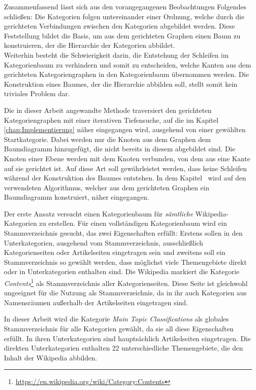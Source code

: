 Zusammenfassend lässt sich aus den vorangegangenen Beobachtungen Folgendes schließen: Die Kategorien folgen untereinander einer Ordnung, welche durch die gerichteten Verbindungen zwischen den Kategorien abgebildet werden.
Diese Feststellung bildet die Basis, um aus dem gerichteten Graphen einen Baum zu konstruieren, der die Hierarchie der Kategorien abbildet.\\
Weiterhin besteht die Schwierigkeit darin, die Entstehung der Schleifen im Kategorienbaum zu verhindern und somit zu entscheiden, welche Kanten aus dem gerichteten Kategoriengraphen in den Kategorienbaum übernommen werden.
Die Konstruktion eines Baumes, der die Hierarchie abbilden soll, stellt somit kein triviales Problem dar.

Die in dieser Arbeit angewandte Methode traversiert den gerichteten Kategoriengraphen mit einer iterativen Tiefensuche, auf die im Kapitel \ref{chap:Implementierung} näher eingegangen wird, ausgehend von einer gewählten Startkategorie.
Dabei werden nur die Knoten aus dem Graphen dem Baumdiagramm hinzugefügt, die nicht bereits in diesem abgebildet sind.
Die Knoten einer Ebene werden mit dem Knoten verbunden, von dem aus eine Kante auf sie gerichtet ist.
Auf diese Art soll gewährleistet werden, dass keine Schleifen während der Konstruktion des Baumes entstehen.
In dem Kapitel~ wird auf den verwendeten Algorithmus, welcher aus dem gerichteten Graphen ein Baumdiagramm konstruiert, näher eingegangen.

Der erste Ansatz versucht einen Kategorienbaum für \emph{sämtliche} Wikipedia-Kategorien zu erstellen.
Für einen vollständigen Kategorienbaum wird ein Stammverzeichnis gesucht, das zwei Eigenschaften erfüllt: Erstens sollen in den Unterkategorien, ausgehend vom Stammverzeichnis, ausschließlich Kategorienseiten oder Artikelseiten eingetragen sein und zweitens soll ein Stammverzeichnis so gewählt werden, dass möglichst viele Themengebiete direkt oder in Unterkategorien enthalten sind.
Die Wikipedia markiert die Kategorie \emph{Contents}\footnote{\url{https://en.wikipedia.org/wiki/Category:Contents}} als Stammverzeichnis aller Kategorienseiten.
Diese Seite ist gleichwohl ungeeignet für die Nutzung als Stammverzeichnis, da in ihr auch Kategorien aus Namensräumen außerhalb der Artikelseiten eingetragen sind.

In dieser Arbeit wird die Kategorie \emph{Main Topic Classifications} als globales Stammverzeichnis für alle Kategorien gewählt, da sie all diese Eigenschaften erfüllt.
In ihren Unterkategorien sind hauptsächlich Artikelseiten eingetragen. 
Die direkten Unterkategorien enthalten 22 unterschiedliche Themengebiete, die den Inhalt der Wikipedia abbilden.

